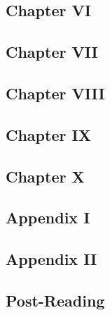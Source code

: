 \documentclass[a4paper, 12pt, twoside]{article}
\begin{document}


\newpage

\subsection*{Chapter VI}



\newpage

\subsection*{Chapter VII}



\newpage

\subsection*{Chapter VIII}



\newpage

\subsection*{Chapter IX}



\newpage

\subsection*{Chapter X}



\newpage

\subsection*{Appendix I}



\newpage

\subsection*{Appendix II}



\newpage

\subsection*{Post-Reading}


\end{document}
